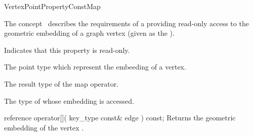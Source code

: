 
\begin{ccRefConcept}{VertexPointPropertyConstMap}


\ccDefinition

The concept \ccRefName\ describes the requirements of a 
providing read-only access to the geometric embedding of a graph vertex
(given as the ).

\ccRefines
  
\ccTypes
    {Indicates that this property is read-only.}
  
    {The point type which represent the embeeding of a vertex.}
    
    {The result type of the map operator.}

  {The type of  whose embedding is accessed.}

\ccCreation
{}  %

\ccOperations

\ccMethod
  {reference operator[]( key_type const& edge ) const;}
  {Returns the geometric embedding of the vertex .}  
  
\ccHasModels
{}\\

\ccSeeAlso
{} 

\end{ccRefConcept}



